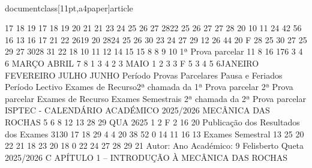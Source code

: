 \\documentclass[11pt,a4paper]{article}
\begin{document}
17 18 19
17 18 19 20 21
21
23 24 25 26 27 2822
25 26 27
27 28 20
10 11
24
42
56
16
13 16 17 21 22
2619 20
2824 25 26
30
23 24
27 29
12
26
44
20
F 28
25
30
27
25
29
27 3028
31
22
18
10 11 12
14 15
15
8
8 9 10
1ª Prova parcelar 
11
8
16 176
3 4
6
MARÇO
ABRIL
7 8
1
3
4
2 3
MAIO
1 2 3
3 F 5
3 4 5 6JANEIRO
FEVEREIRO
JULHO
JUNHO
Período Provas Parcelares
Pausa e Feriados
Período Lectivo
Exames de Recurso2ª chamada da 1ª Prova parcelar 
2ª Prova parcelar Exames de Recurso
Exames Semestrais
2ª chamada da 2ª Prova parcelar 
ISPTEC - CALENDÁRIO  ACADÉMICO 2025/2026  MECÂNICA DAS ROCHAS
5 6 8 12 13
28 29
QUA
2625
1 2
F
2
16 20
Publicação dos Resultados dos 
Exames
3130
17 18 29
4
4
20
38
52
0
14
11
16
13
Exames Semestral
13
25
20
22
21
18
23
20
18
0
22 24
27 28 29
21
Autor:
Ano Académico:
9
Felisberto Queta
2025/2026
C
APÍTULO 1 
–
INTRODUÇÃO À MECÂNICA 
DAS ROCHAS\
\end{document}
